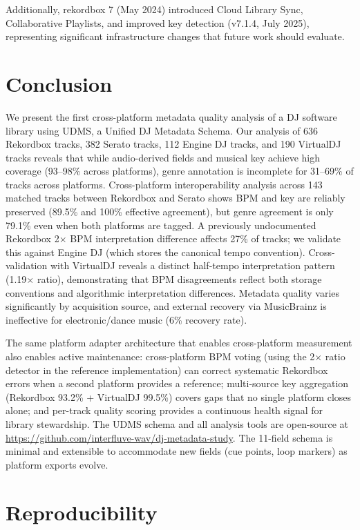 \documentclass[letterpaper,10pt]{article}
\begin{document}
Additionally, rekordbox 7 (May 2024) introduced Cloud Library Sync, Collaborative Playlists, and improved key detection (v7.1.4, July 2025), representing significant infrastructure changes that future work should evaluate.

\section{Conclusion}

We present the first cross-platform metadata quality analysis of a DJ software library using UDMS, a Unified DJ Metadata Schema. Our analysis of 636 Rekordbox tracks, 382 Serato tracks, 112 Engine DJ tracks, and 190 VirtualDJ tracks reveals that while audio-derived fields and musical key achieve high coverage (93--98\% across platforms), genre annotation is incomplete for 31--69\% of tracks across platforms. Cross-platform interoperability analysis across 143 matched tracks between Rekordbox and Serato shows BPM and key are reliably preserved (89.5\% and 100\% effective agreement), but genre agreement is only 79.1\% even when both platforms are tagged. A previously undocumented Rekordbox 2$\times$ BPM interpretation difference affects 27\% of tracks; we validate this against Engine DJ (which stores the canonical tempo convention). Cross-validation with VirtualDJ reveals a distinct half-tempo interpretation pattern (1.19$\times$ ratio), demonstrating that BPM disagreements reflect both storage conventions and algorithmic interpretation differences. Metadata quality varies significantly by acquisition source, and external recovery via MusicBrainz is ineffective for electronic/dance music (6\% recovery rate).

The same platform adapter architecture that enables cross-platform measurement also enables active maintenance: cross-platform BPM voting (using the 2$\times$ ratio detector in the reference implementation) can correct systematic Rekordbox errors when a second platform provides a reference; multi-source key aggregation (Rekordbox 93.2\% + VirtualDJ 99.5\%) covers gaps that no single platform closes alone; and per-track quality scoring provides a continuous health signal for library stewardship. The UDMS schema and all analysis tools are open-source at \url{https://github.com/interfluve-wav/dj-metadata-study}. The 11-field schema is minimal and extensible to accommodate new fields (cue points, loop markers) as platform exports evolve.\

\section{Reproducibility}
\end{document}
